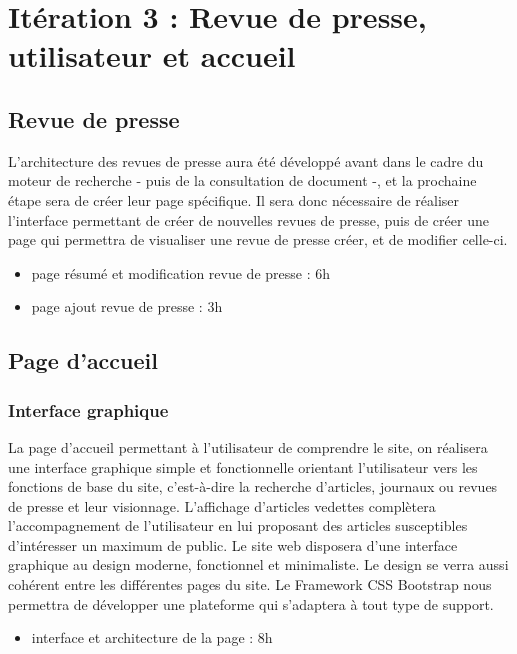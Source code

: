 \section{Itération 3 : Revue de presse, utilisateur et accueil}
\label{subsec:revue_util_accueil}
	\subsection{Revue de presse}
	\label{subsec:revue}

		L'architecture des revues de presse aura été développé avant dans le cadre du moteur de recherche - puis de la consultation de document -, et la prochaine étape sera de créer leur page spécifique. Il sera donc nécessaire de réaliser l'interface permettant de créer de nouvelles revues de presse, puis de créer une page qui permettra de visualiser une revue de presse créer, et de modifier celle-ci.

		\begin{itemize}
			\item page résumé et modification revue de presse : 6h
			\item page ajout revue de presse : 3h
		\end{itemize}

	\subsection{Page d'accueil}
	\label{subsec:accueil}
		\subsubsection{Interface graphique}
		\label{subsubsec:acc_interface}
			
			La page d'accueil permettant à l'utilisateur de comprendre le site, on réalisera une interface graphique simple et fonctionnelle orientant l'utilisateur vers les fonctions de base du site, c'est-à-dire la recherche d'articles, journaux ou revues de presse et leur visionnage. L'affichage d'articles vedettes complètera l'accompagnement de l'utilisateur en lui proposant des articles susceptibles d'intéresser un maximum de public.
			Le site web disposera d'une interface graphique au design moderne, fonctionnel et minimaliste. Le design se verra aussi cohérent entre les différentes pages du site. Le Framework CSS Bootstrap nous permettra de développer une plateforme qui s'adaptera à tout type de support.

			\begin{itemize}
				\item interface et architecture de la page : 8h
			\end{itemize}

